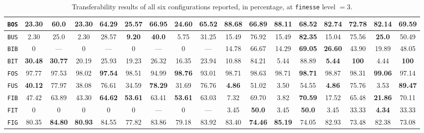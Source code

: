 \begin{sidewaystable}
\begin{center}
\begin{tabular}{|c | c c | c c | c c | c c || c c | c c | c c | c c |}
                    \texttt{BOS} & 23.30 & 60.0 & 23.30 & 64.29 & \textbf{25.57} & \textbf{66.95} & 24.60 & 65.52 & \textbf{88.68} & 66.89 & 88.11 & 68.52 & 82.74 & \textbf{72.78} & 82.14 & 69.59 \\
                    \hline
                    \texttt{BUS} & 2.30 & 25.0 & 2.30 & 28.57 & \textbf{9.20} & \textbf{40.0} & 5.75 & 31.25 & 15.49 & 76.92 & 15.49 & \textbf{82.35} & 15.04 & 75.56 & \textbf{25.0} & 50.49 \\
                    \hline
                    \texttt{BIB} & 0 & --- & 0 & --- & 0 & --- & 0 & --- & 14.78 & 66.67 & 14.29 & \textbf{69.05} & \textbf{26.60} & 43.90 & 19.89 & 48.05 \\
                    \hline
                    \texttt{BIT} & \textbf{30.48} & \textbf{30.77} & 20.19 & 25.93 & 19.23 & 26.32 & 16.35 & 23.94 & 10.88 & 84.21 & 5.44 & 88.89 & \textbf{5.44} & \textbf{100} & 4.44 & \textbf{100} \\
                    \hline
                    \texttt{FOS} & 97.77 & 97.53 & 98.02 & \textbf{97.54} & 98.51 & 94.99 & \textbf{98.76} & 93.01 & 98.71 & 98.63 & 98.71 & \textbf{98.71} & 98.87 & 98.31 & \textbf{99.06} & 97.14 \\
                    \hline
                    \texttt{FUS} & \textbf{40.12} & 77.97 & 38.08 & 76.61 & 34.59 & \textbf{78.29} & 31.69 & 76.76 & \textbf{4.86} & 51.02 & 3.50 & 54.55 & \textbf{4.86} & 75.76 & 3.53 & \textbf{89.47} \\
                    \hline
                    \texttt{FIB} & 47.42 & 63.89 & 43.30 & \textbf{64.62} & \textbf{53.61} & 63.41 & \textbf{53.61} & 63.03 & 7.32 & 69.70 & 3.82 & \textbf{70.59} & 17.52 & 65.48 & \textbf{21.86} & 70.11 \\
                    \hline
                    \texttt{FIT} & 0 & 0 & 0 & 0 & 0 & --- & 0 & --- & 3.45 & \textbf{50.0} & 3.45 & \textbf{50.0} & 3.45 & 33.33 & \textbf{4.34} & 33.33 \\
                    \hline
                    \texttt{FIG} & 80.35 & \textbf{84.80} & \textbf{80.93} & 84.55 & 77.82 & 83.86 & 79.18 & 83.92 & 83.40 & \textbf{74.46} & \textbf{85.19} & 74.05 & 82.93 & 73.48 & 82.38 & 73.08 \\
                    \hline
                \end{tabular}
                \caption{
                    \label{tab::transferability_f3}
                    Transferability results of all six configurations reported, in percentage, at \texttt{finesse} level $=3$.
                }
            \end{center}
        \end{sidewaystable}
